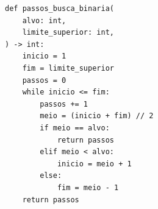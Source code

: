 \ifmostrarGabarito
\begin{verbatim}
def passos_busca_binaria(
    alvo: int,
    limite_superior: int,
) -> int:
    inicio = 1
    fim = limite_superior
    passos = 0
    while inicio <= fim:
        passos += 1
        meio = (inicio + fim) // 2
        if meio == alvo:
            return passos
        elif meio < alvo:
            inicio = meio + 1
        else:
            fim = meio - 1
    return passos
\end{verbatim}

\fi
